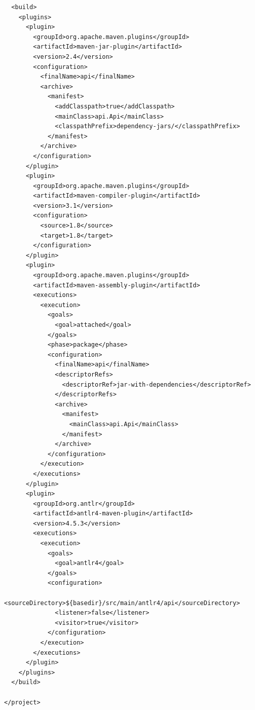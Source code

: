 \documentclass{l4proj}
\begin{document}
\begin{appendices}
\begin{lstlisting}
  <build>
    <plugins>
      <plugin>
        <groupId>org.apache.maven.plugins</groupId>
        <artifactId>maven-jar-plugin</artifactId>
        <version>2.4</version>
        <configuration>
          <finalName>api</finalName>
          <archive>
            <manifest>
              <addClasspath>true</addClasspath>
              <mainClass>api.Api</mainClass>
              <classpathPrefix>dependency-jars/</classpathPrefix>
            </manifest>
          </archive>
        </configuration>
      </plugin>
      <plugin>
        <groupId>org.apache.maven.plugins</groupId>
        <artifactId>maven-compiler-plugin</artifactId>
        <version>3.1</version>
        <configuration>
          <source>1.8</source>
          <target>1.8</target>
        </configuration>
      </plugin>
      <plugin>
        <groupId>org.apache.maven.plugins</groupId>
        <artifactId>maven-assembly-plugin</artifactId>
        <executions>
          <execution>
            <goals>
              <goal>attached</goal>
            </goals>
            <phase>package</phase>
            <configuration>
              <finalName>api</finalName>
              <descriptorRefs>
                <descriptorRef>jar-with-dependencies</descriptorRef>
              </descriptorRefs>
              <archive>
                <manifest>
                  <mainClass>api.Api</mainClass>
                </manifest>
              </archive>
            </configuration>
          </execution>
        </executions>
      </plugin>
      <plugin>
        <groupId>org.antlr</groupId>
        <artifactId>antlr4-maven-plugin</artifactId>
        <version>4.5.3</version>
        <executions>
          <execution>
            <goals>
              <goal>antlr4</goal>
            </goals>
            <configuration>
              <sourceDirectory>${basedir}/src/main/antlr4/api</sourceDirectory>
              <listener>false</listener>
              <visitor>true</visitor>
            </configuration>
          </execution>
        </executions>
      </plugin>
    </plugins>
  </build>

</project>
\end{lstlisting}


\end{appendices}
\end{document}
